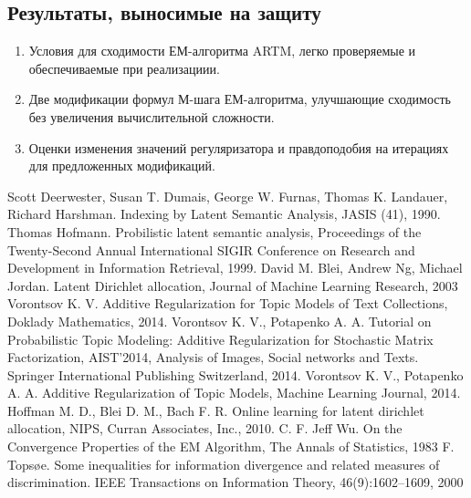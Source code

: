 \documentclass[12pt]{article}
\begin{document}
\subsection{Результаты, выносимые на защиту}
\begin{enumerate}
\item Условия для сходимости ЕМ-алгоритма ARTM, легко проверяемые и обеспечиваемые при реализациии.
\item Две модификации формул М-шага ЕМ-алгоритма, улучшающие сходимость без увеличения вычислительной сложности.
\item Оценки изменения значений регуляризатора и правдоподобия на итерациях для предложенных модификаций.
\end{enumerate}
\newpage
	\begin{thebibliography}{@@@@}
		Scott Deerwester, Susan T. Dumais, George W. Furnas, Thomas K. Landauer, Richard Harshman. Indexing by Latent Semantic Analysis,  JASIS (41), 1990.
		Thomas Hofmann. Probilistic latent semantic analysis, Proceedings of the Twenty-Second Annual International SIGIR Conference on Research and Development in Information Retrieval, 1999.
		David M. Blei, Andrew Ng, Michael Jordan. Latent Dirichlet allocation, Journal of Machine Learning Research,  2003
		Vorontsov K. V. Additive Regularization for Topic Models of Text Collections, Doklady Mathematics, 2014.
		Vorontsov K. V., Potapenko A. A. Tutorial on Probabilistic Topic Modeling: Additive Regularization for Stochastic Matrix Factorization,  AIST’2014, Analysis of Images, Social networks and Texts. Springer International Publishing Switzerland, 2014.
		Vorontsov K. V., Potapenko A. A. Additive Regularization of Topic Models, Machine Learning Journal, 2014.
		Hoffman M. D., Blei D. M., Bach F. R. Online learning for latent dirichlet allocation, NIPS, Curran Associates, Inc., 2010.
		C. F. Jeff Wu. On the Convergence Properties of the EM Algorithm, The Annals of Statistics, 1983
		F. Topsøe. Some inequalities for information divergence and related measures of discrimination. IEEE Transactions on Information Theory, 46(9):1602–1609, 2000
	\end{thebibliography}
\end{document}

